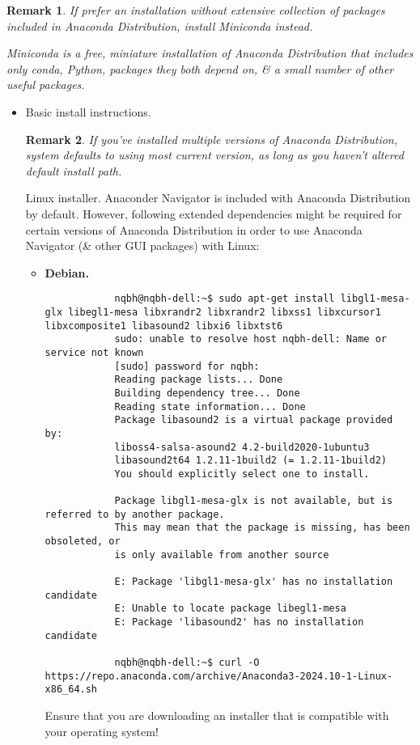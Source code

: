 \documentclass{article}
\newtheorem{remark}{Remark}
\begin{document}
\begin{remark}
	If prefer an installation without extensive collection of packages included in Anaconda Distribution, install Miniconda instead.
	
	Miniconda is a free, miniature installation of Anaconda Distribution that includes only conda, Python, packages they both depend on, \& a small number of other useful packages.
\end{remark}

\begin{itemize}
	\item {\sf Basic install instructions.}
	
	\begin{remark}
		If you've installed multiple versions of Anaconda Distribution, system defaults to using most current version, as long as you haven't altered default install path.
	\end{remark}
	{\sf Linux installer.} Anaconder Navigator is included with Anaconda Distribution by default. However, following extended dependencies might be required for certain versions of Anaconda Distribution in order to use Anaconda Navigator (\& other GUI packages) with Linux:
	\begin{itemize}
		\item {\bf Debian.}
		\begin{verbatim}
			nqbh@nqbh-dell:~$ sudo apt-get install libgl1-mesa-glx libegl1-mesa libxrandr2 libxrandr2 libxss1 libxcursor1 libxcomposite1 libasound2 libxi6 libxtst6
			sudo: unable to resolve host nqbh-dell: Name or service not known
			[sudo] password for nqbh: 
			Reading package lists... Done
			Building dependency tree... Done
			Reading state information... Done
			Package libasound2 is a virtual package provided by:
			liboss4-salsa-asound2 4.2-build2020-1ubuntu3
			libasound2t64 1.2.11-1build2 (= 1.2.11-1build2)
			You should explicitly select one to install.
			
			Package libgl1-mesa-glx is not available, but is referred to by another package.
			This may mean that the package is missing, has been obsoleted, or
			is only available from another source
			
			E: Package 'libgl1-mesa-glx' has no installation candidate
			E: Unable to locate package libegl1-mesa
			E: Package 'libasound2' has no installation candidate
			
			nqbh@nqbh-dell:~$ curl -O https://repo.anaconda.com/archive/Anaconda3-2024.10-1-Linux-x86_64.sh
		\end{verbatim}
		Ensure that you are downloading an installer that is compatible with your operating system!
		

\end{itemize}
\end{itemize}
\end{document}
